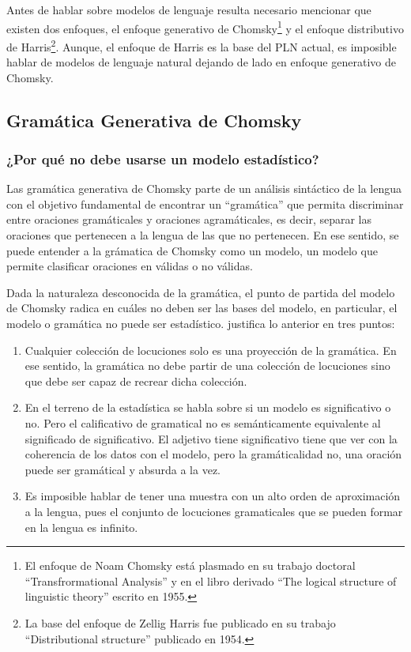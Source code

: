 Antes de hablar sobre modelos de lenguaje resulta necesario mencionar que existen dos enfoques, el enfoque generativo de Chomsky\footnote{El enfoque de Noam Chomsky está plasmado en su trabajo doctoral ``Transfrormational Analysis'' y en el libro derivado ``The logical structure of linguistic theory'' escrito en 1955.} y el enfoque distributivo de Harris\footnote{La base del enfoque de Zellig Harris fue publicado en su trabajo ``Distributional structure'' publicado en 1954.}. Aunque, el enfoque de Harris es la base del PLN actual, es imposible hablar de modelos de lenguaje natural dejando de lado en enfoque generativo de Chomsky.

\subsection{Gramática Generativa de Chomsky}
\label{subsec:sec211}


\subsubsection{¿Por qué no debe usarse un modelo estadístico?}
\label{subsubsec:sec2111}

Las gramática generativa de Chomsky parte de un análisis sintáctico de la lengua con el objetivo fundamental de encontrar un ``gramática'' que permita discriminar entre oraciones gramáticales y oraciones agramáticales, es decir, separar las oraciones que pertenecen a la lengua de las que no pertenecen. En ese sentido, se puede entender a la grámatica de Chomsky como un modelo, un modelo que permite clasificar oraciones en válidas o no válidas. 

Dada la naturaleza desconocida de la gramática, el punto de partida del modelo de Chomsky radica en cuáles no deben ser las bases del modelo, en particular, el modelo o gramática no puede ser estadístico. \cite{chomsky2004estructuras} justifica lo anterior en tres puntos:

\begin{enumerate}
	\item Cualquier colección de locuciones solo es una proyección de la gramática. En ese sentido, la gramática no debe partir de una colección de locuciones sino que debe ser capaz de recrear dicha colección.
	
	\item En el terreno de la estadística se habla sobre si un modelo es significativo o no. Pero el calificativo de gramatical no es semánticamente equivalente al significado de significativo. El adjetivo tiene significativo tiene que ver con la coherencia de los datos con el modelo, pero la gramáticalidad no, una oración puede ser gramátical y absurda a la vez.
	
	\item Es imposible hablar de tener una muestra con un alto orden de aproximación a la lengua, pues el conjunto de locuciones gramaticales que se pueden formar en la lengua es infinito.
\end{enumerate}

